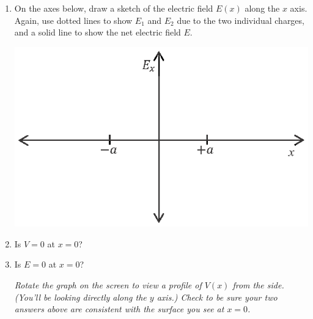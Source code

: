 \begin{enumerate}[wide, label=(\emph{\alph*})]
\item On the axes below, draw a sketch of the electric field $E(x)$ along the $x$ axis.  Again, use dotted lines to show $E_1$ and $E_2$ due to the two individual charges, and a solid line to show the net electric field $E$.
\begin{center}
\includegraphics{potential_superposition/activity_2_3_figs/E_axes.eps}
\end{center}

\item Is $V=0$ at $x=0$?
\answerspace{0.3in}

\item Is $E=0$ at $x=0$?
\answerspace{0.3in}

\textit{Rotate the graph on the screen to view a profile of $V(x)$ from the side.  (You'll be looking directly along the $y$ axis.)  Check to be sure your two answers above are consistent with the surface you see at $x=0$.}


\end{enumerate}
